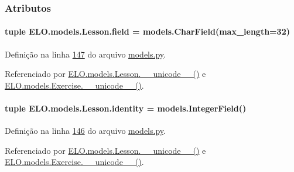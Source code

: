 \subsubsection{Atributos}
\hypertarget{classELO_1_1models_1_1Lesson_a1657c9c36e8d9c58d86c272e2339e7b1}{
\paragraph[{field}]{\setlength{\rightskip}{0pt plus 5cm}tuple E\-L\-O.\-models.\-Lesson.\-field = models.\-Char\-Field(max\-\_\-length=32)\hspace{0.3cm}{\ttfamily [static]}}}\label{classELO_1_1models_1_1Lesson_a1657c9c36e8d9c58d86c272e2339e7b1}


Definição na linha \hyperlink{ELO_2models_8py_source_l00147}{147} do arquivo \hyperlink{ELO_2models_8py_source}{models.\-py}.



Referenciado por \hyperlink{classELO_1_1models_1_1Lesson_a3d9f0295dbe1ed5c74668d6c0876f97c}{E\-L\-O.\-models.\-Lesson.\-\_\-\-\_\-unicode\-\_\-\-\_\-()} e \hyperlink{classELO_1_1models_1_1Exercise_af3e991e5610cec815a2c3260ec6aae0b}{E\-L\-O.\-models.\-Exercise.\-\_\-\-\_\-unicode\-\_\-\-\_\-()}.

\hypertarget{classELO_1_1models_1_1Lesson_aa650c6add387eee9e15421717074c0d3}{
\paragraph[{identity}]{\setlength{\rightskip}{0pt plus 5cm}tuple E\-L\-O.\-models.\-Lesson.\-identity = models.\-Integer\-Field()\hspace{0.3cm}{\ttfamily [static]}}}\label{classELO_1_1models_1_1Lesson_aa650c6add387eee9e15421717074c0d3}


Definição na linha \hyperlink{ELO_2models_8py_source_l00146}{146} do arquivo \hyperlink{ELO_2models_8py_source}{models.\-py}.



Referenciado por \hyperlink{classELO_1_1models_1_1Lesson_a3d9f0295dbe1ed5c74668d6c0876f97c}{E\-L\-O.\-models.\-Lesson.\-\_\-\-\_\-unicode\-\_\-\-\_\-()} e \hyperlink{classELO_1_1models_1_1Exercise_af3e991e5610cec815a2c3260ec6aae0b}{E\-L\-O.\-models.\-Exercise.\-\_\-\-\_\-unicode\-\_\-\-\_\-()}.


